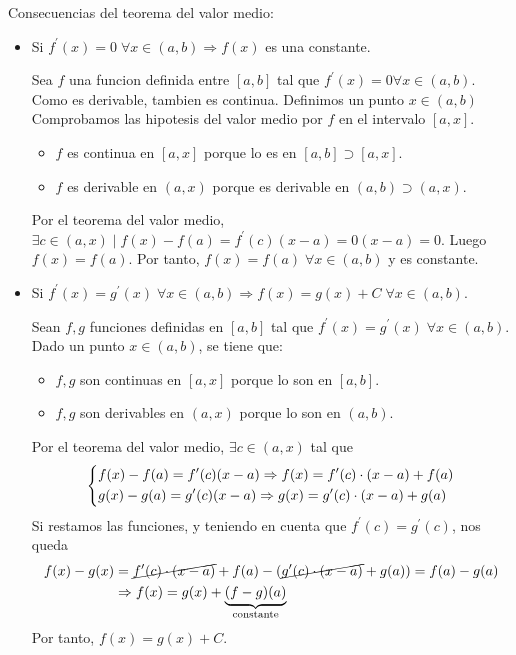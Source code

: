 \begin{remark}
	Consecuencias del teorema del valor medio:
	\begin{itemize}
		\item Si \(f^\prime  (x) = 0 \; \forall x \in (a,b) \Rightarrow f(x )\) es una constante.

		      Sea \(f \) una funcion definida entre \([a,b]\) tal que \(f^\prime (x) = 0 \forall x \in (a,b )\). Como es derivable, tambien es continua. Definimos un punto \(x \in (a,b)\) Comprobamos las hipotesis del valor medio por \(f \) en el intervalo \([a,x ]\).
		      \begin{itemize}
			      \item \(f \) es continua en \([a,x ]\) porque lo es en \([a,b] \supset [a,x ]\).
			      \item \(f \) es derivable en \((a,x )\) porque es derivable en \((a,b) \supset (a,x )\).
		      \end{itemize}
		      Por el teorema del valor medio, \(\exists c \in (a,x) \mid f(x) - f(a) = f^\prime (c) (x-a) = 0 (x-a) = 0\). Luego \(f(x) = f(a )\). Por tanto, \(f(x) = f(a) \;\forall x \in (a,b )\) y es constante.
		\item Si \(f^\prime (x) = g^\prime (x) \; \forall x \in (a,b) \Rightarrow f(x) = g(x) + C \; \forall x \in (a,b )\).

		      Sean \(f,g \) funciones definidas en \([a,b ]\) tal que \(f^\prime (x) = g^\prime (x ) \; \forall x \in (a,b)\). Dado un punto \(x \in (a,b)\), se tiene que:
		      \begin{itemize}
			      \item \(f, g \) son continuas en \([a,x ]\) porque lo son en \([a,b ]\).
			      \item \(f,g \) son derivables en \((a,x )\) porque lo son en \((a,b )\).
		      \end{itemize}
		      Por el teorema del valor medio, \(\exists c \in (a,x)\) tal que
		      \[
			      \begin{dcases}
				      f(x) - f(a) = f^\prime (c)(x - a) \Rightarrow f(x) = f^\prime (c) \cdot (x - a) + f(a) \\
				      g(x) - g(a) = g^\prime (c) (x-a) \Rightarrow g(x) = g^\prime (c) \cdot (x - a) + g(a)
			      \end{dcases}
		      \]
		      Si restamos las funciones, y teniendo en cuenta que \(f^\prime (c) = g^\prime (c)\), nos queda
		      \begin{align*}
			      f(x) - g(x) & = \cancel {f^\prime (c) \cdot (x - a)} + f(a) - (\cancel {g^\prime (c) \cdot (x - a)} + g(a)) = f(a) - g(a) \\ & \Rightarrow f(x) = g(x) + \underbrace{(f-g)(a)}_{\text{constante}}
		      \end{align*}
		      Por tanto, \(f(x) = g(x) + C \).
	\end{itemize}
\end{remark}
